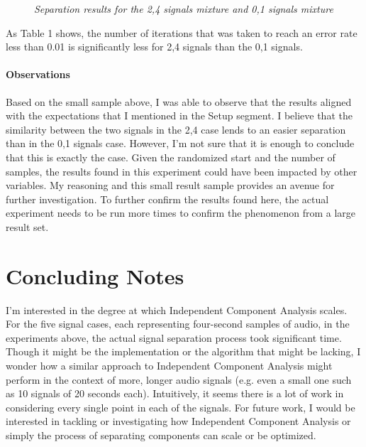 \documentclass{article} %
\begin{document}
\begin{figure}
{            \label{fig:left}%
        }\hfill%
    \caption{\textit{Separation results for the 2,4 signals mixture and 0,1 signals mixture}}
    \label{fig:default}
\end{figure}

As Table 1 shows, the number of iterations that was taken to reach an error rate less than 0.01 is significantly less for 2,4 signals than the 0,1 signals.

\paragraph{Observations}

Based on the small sample above, I was able to observe that the results aligned with the expectations that I mentioned in the Setup segment. I believe that the similarity between the two signals in the 2,4 case lends to an easier separation than in the 0,1 signals case. However, I'm not sure that it is enough to conclude that this is exactly the case. Given the randomized start and the number of samples, the results found in this experiment could have been impacted by other variables. My reasoning and this small result sample provides an avenue for further investigation. To further confirm the results found here, the actual experiment needs to be run more times to confirm the phenomenon from a large result set. 

\section{Concluding Notes}

I'm interested in the degree at which Independent Component Analysis scales. For the five signal cases, each representing four-second samples of audio, in the experiments above, the actual signal separation process took significant time. Though it might be the implementation or the algorithm that might be lacking, I wonder how a similar approach to Independent Component Analysis might perform in the context of more, longer audio signals (e.g. even a small one such as 10 signals of 20 seconds each). Intuitively, it seems there is a lot of work in considering every single point in each of the signals. For future work, I would be interested in tackling or investigating how Independent Component Analysis or simply the process of separating components can scale or be optimized.
\end{document}
